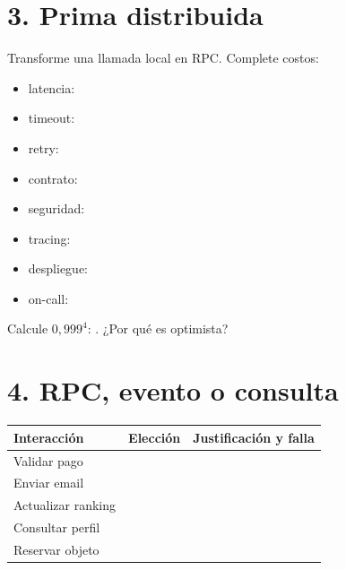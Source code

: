 \documentclass[variant=guia,cover=institutional,mode=print]{ua-engineering-v6-article}
\begin{document}
\newpage
\section{3. Prima distribuida}
Transforme una llamada local en RPC. Complete costos:

\begin{center}
\end{center}


\begin{itemize}
\item latencia: \hrulefill
\item timeout: \hrulefill
\item retry: \hrulefill
\item contrato: \hrulefill
\item seguridad: \hrulefill
\item tracing: \hrulefill
\item despliegue: \hrulefill
\item on-call: \hrulefill
\end{itemize}


Calcule $0{,}999^4$: \hrulefill. ¿Por qué es optimista? \vspace{1cm}

\newpage
\section{4. RPC, evento o consulta}

\begin{tabular}{p{}p{}p{}}
\toprule
Interacción & Elección & Justificación y falla \\
\midrule
Validar pago & & \rule{0pt}{1.1cm} \\
Enviar email & & \rule{0pt}{1.1cm} \\
Actualizar ranking & & \rule{0pt}{1.1cm} \\
Consultar perfil & & \rule{0pt}{1.1cm} \\
Reservar objeto & & \rule{0pt}{1.1cm} \\
\bottomrule
\end{tabular}
\end{document}
